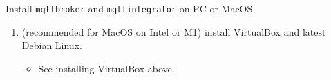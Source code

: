 \begin{frame}{Install \texttt{mqttbroker} and \texttt{mqttintegrator} on PC or MacOS}
\begin{enumerate}
    \begin{itemize}
      \item See: \textcolor{fh-ooe-red}{\href{https://kb.parallels.com/128445}{https://kb.parallels.com/128445}}.
    \end{itemize}
    \item[Or] (recommended for \textcolor{fh-ooe-red}{MacOS} on Intel or M1) install \textcolor{fh-ooe-red}{VirtualBox} and latest Debian Linux.
    \begin{itemize}
      \item See installing \textcolor{fh-ooe-red}{VirtualBox} above.
    \end{itemize}
  \end{enumerate}
\end{frame}
